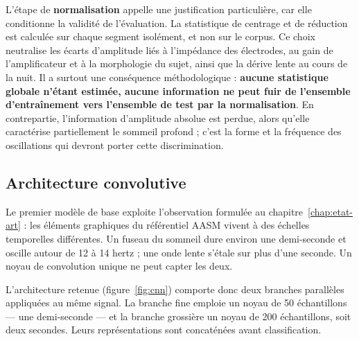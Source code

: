L'étape de \textbf{normalisation} appelle une justification particulière, car elle
conditionne la validité de l'évaluation. La statistique de centrage et de réduction
est calculée sur chaque segment isolément, et non sur le corpus. Ce choix neutralise
les écarts d'amplitude liés à l'impédance des électrodes, au gain de l'amplificateur
et à la morphologie du sujet, ainsi que la dérive lente au cours de la nuit. Il a
surtout une conséquence méthodologique : \textbf{aucune statistique globale n'étant
estimée, aucune information ne peut fuir de l'ensemble d'entraînement vers l'ensemble
de test par la normalisation}. En contrepartie, l'information d'amplitude absolue est
perdue, alors qu'elle caractérise partiellement le sommeil profond ; c'est la forme et
la fréquence des oscillations qui devront porter cette discrimination.

\subsection{Architecture convolutive}

Le premier modèle de base exploite l'observation formulée au
chapitre~\ref{chap:etat-art} : les éléments graphiques du référentiel AASM vivent à
des échelles temporelles différentes. Un fuseau du sommeil dure environ une demi-seconde
et oscille autour de 12 à 14 hertz ; une onde lente s'étale sur plus d'une seconde.
Un noyau de convolution unique ne peut capter les deux.

L'architecture retenue (figure~\ref{fig:cnn}) comporte donc deux branches parallèles
appliquées au même signal. La branche fine emploie un noyau de 50 échantillons — une
demi-seconde — et la branche grossière un noyau de 200 échantillons, soit deux
secondes. Leurs représentations sont concaténées avant classification.


